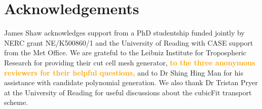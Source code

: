 \documentclass[times]{elsarticle}
\newcommand{\revother}[1]{\textcolor{orange}{\textbf{#1}}}
\begin{document}






\section{Acknowledgements}
James Shaw acknowledges support from a PhD studentship funded jointly by NERC grant NE/K500860/1 and the University of Reading with CASE support from the Met Office.
We are grateful to the Leibniz Institute for Tropospheric Research for providing their cut cell mesh generator, \revother{to the three anonymous reviewers for their helpful questions,} and to Dr Shing Hing Man for his assistance with candidate polynomial generation.  We also thank Dr Tristan Pryer at the University of Reading for useful discussions about the cubicFit transport scheme.






\end{document}
